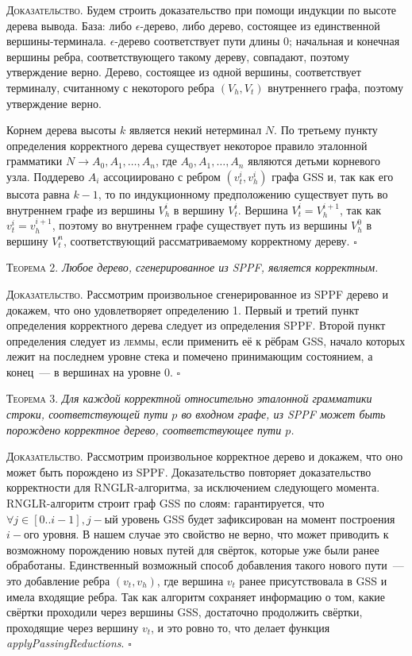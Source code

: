 \textsc{Доказательство.}
Будем строить доказательство при помощи индукции по высоте дерева вывода. База: либо 
$\epsilon$-дерево, либо дерево, состоящее из единственной вершины-терминала. 
$\epsilon$-дерево соответствует пути длины $0$; начальная и конечная вершины 
ребра, соответствующего такому дереву, совпадают, поэтому утверждение верно. 
Дерево, состоящее из одной вершины, соответствует терминалу, считанному с 
некоторого ребра $(V_{h}, V_{t})$ внутреннего графа, поэтому утверждение верно.

Корнем дерева высоты $k$ является некий нетерминал $N$. По третьему пункту 
определения корректного дерева существует некоторое правило эталонной 
грамматики $N \rightarrow A_{0}, A_{1}, \dots, A_{n}$, где $A_{0}, A_{1}, 
\dots, A_{n}$ являются детьми корневого узла. Поддерево $A_{i}$ 
ассоциировано с ребром $(v_{t}^{i}, v_{h}^{i})$ графа GSS и, так как его 
высота равна $k-1$, то по индукционному предположению существует путь во 
внутреннем графе из вершины $V_{h}^{i}$ в вершину $V_{t}^{i}$. Вершина 
$V_{t}^{i} = V_{h}^{i+1}$, так как $v_{t}^{i} = v_{h}^{i+1}$, поэтому во 
внутреннем графе существует путь из вершины $V_{h}^{0}$ в вершину 
$V_{t}^{n}$, соответствующий рассматриваемому корректному дереву. $\square$

\textsc{Теорема 2.} 
\textit{Любое дерево, сгенерированное из SPPF, является корректным.}

\textsc{Доказательство.}
Рассмотрим произвольное сгенерированное из SPPF дерево и докажем, что оно 
удовлетворяет определению 1. Первый и третий пункт определения корректного дерева следует из определения SPPF. Второй пункт определения следует из \textsc{леммы}, если применить её к рёбрам GSS, начало которых лежит на последнем уровне стека и помечено принимающим состоянием, а конец~--- в вершинах на уровне 0. $\square$

\textsc{Теорема 3.} 
\textit{Для каждой корректной относительно эталонной грамматики строки, соответствующей пути $p$ во входном графе, из SPPF может быть порождено корректное дерево, соответствующее пути $p$.}

\textsc{Доказательство.}
Рассмотрим произвольное корректное дерево и докажем, что оно может быть порождено из SPPF. Доказательство повторяет доказательство корректности для RNGLR-алгоритма, за исключением следующего момента. RNGLR-алгоритм строит граф GSS по слоям: гарантируется, что $\forall j \in [0..i-1], j-$ый уровень GSS будет зафиксирован на момент построения $i-$ого уровня. В нашем случае это свойство не верно, что может приводить к возможному порождению новых путей для свёрток, которые уже были ранее обработаны. Единственный возможный способ добавления такого нового пути~--- это добавление ребра $(v_{t}, v_{h})$, где вершина $v_{t}$ ранее присутствовала в GSS и имела входящие ребра. Так как алгоритм сохраняет информацию о том, какие свёртки проходили через вершины GSS, достаточно продолжить свёртки, проходящие через вершину $v_{t}$, и это ровно то, что делает функция \emph{applyPassingReductions}. $\square$


